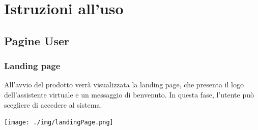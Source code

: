  

\section{Istruzioni all'uso}

\subsection{Pagine User}

\subsubsection{Landing page}
All'avvio del prodotto verrà visualizzata la landing page, che presenta il logo dell'assistente virtuale e un messaggio di benvenuto. In questa fase, l'utente può scegliere di accedere al sistema.
\begin{center}
    \texttt{[image: ./img/landingPage.png]}
\end{center}

